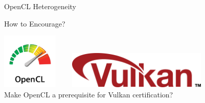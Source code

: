 \begin{frame}{OpenCL Heterogeneity}

 \begin{block}{How to Encourage?}
 \end{block}

 
 \begin{center}
  \includegraphics[width=0.2\textwidth]{figures/opencl} \ \ \ \ 
  \includegraphics[width=0.5\textwidth]{figures/vulkan-logo}\\[1.5em]
  Make OpenCL a prerequisite for Vulkan certification?
 \end{center}
 
\end{frame}
